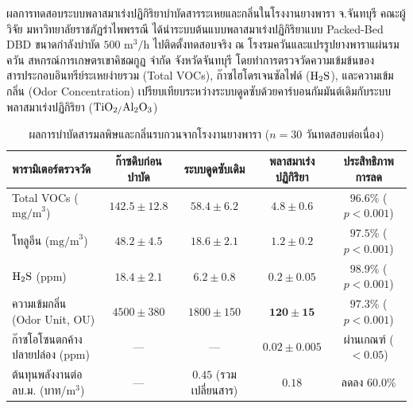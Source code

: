 \begin{agribox}{ผลการทดสอบระบบพลาสมาเร่งปฏิกิริยาบำบัดสารระเหยและกลิ่นในโรงงานยางพารา จ.จันทบุรี}
คณะผู้วิจัย มหาวิทยาลัยราชภัฏรำไพพรรณี ได้นำระบบต้นแบบพลาสมาเร่งปฏิกิริยาแบบ Packed-Bed DBD ขนาดกำลังบำบัด $500 \text{ m}^3/\text{h}$ ไปติดตั้งทดสอบจริง ณ โรงรมควันและแปรรูปยางพาราแผ่นรมควัน สหกรณ์การเกษตรเขาคิชฌกูฏ จำกัด จังหวัดจันทบุรี โดยทำการตรวจวัดความเข้มข้นของสารประกอบอินทรีย์ระเหยง่ายรวม (Total VOCs), ก๊าซไฮโดรเจนซัลไฟด์ ($\ce{H2S}$), และความเข้มกลิ่น (Odor Concentration) เปรียบเทียบระหว่างระบบดูดซับด้วยคาร์บอนกัมมันต์เดิมกับระบบพลาสมาเร่งปฏิกิริยา ($\ce{TiO2/Al2O3}$)

\begin{table}[H]
\centering
\small
\caption{ผลการบำบัดสารมลพิษและกลิ่นรบกวนจากโรงงานยางพารา ($n = 30$ วันทดสอบต่อเนื่อง)}
\label{tab:ch07_rubber_results}
\begin{tabular}{lcccc}
\toprule
\textbf{พารามิเตอร์ตรวจวัด} & \textbf{ก๊าซดิบก่อนบำบัด} & \textbf{ระบบดูดซับเดิม} & \textbf{พลาสมาเร่งปฏิกิริยา} & \textbf{ประสิทธิภาพการลด} \\
\midrule
Total VOCs ($\text{mg/m}^3$) & $142.5 \pm 12.8$ & $58.4 \pm 6.2$ & $\mathbf{4.8 \pm 0.6}$ & $\mathbf{96.6\%}$ ($p < 0.001$) \\
โทลูอีน ($\text{mg/m}^3$) & $48.2 \pm 4.5$ & $18.6 \pm 2.1$ & $\mathbf{1.2 \pm 0.2}$ & $\mathbf{97.5\%}$ ($p < 0.001$) \\
$\ce{H2S}$ ($\text{ppm}$) & $18.4 \pm 2.1$ & $6.2 \pm 0.8$ & $\mathbf{0.2 \pm 0.05}$ & $\mathbf{98.9\%}$ ($p < 0.001$) \\
ความเข้มกลิ่น (Odor Unit, OU) & $4500 \pm 380$ & $1800 \pm 150$ & $\mathbf{120 \pm 15}$ & $\mathbf{97.3\%}$ ($p < 0.001$) \\
ก๊าซโอโซนตกค้างปลายปล่อง ($\text{ppm}$) & --- & --- & $\mathbf{0.02 \pm 0.005}$ & ผ่านเกณฑ์ ($<0.05$) \\
ต้นทุนพลังงานต่อ ลบ.ม. (บาท/$\text{m}^3$) & --- & $0.45$ (รวมเปลี่ยนสาร) & $\mathbf{0.18}$ & ลดลง $60.0\%$ \\
\bottomrule
\end{tabular}
\end{table}


\end{agribox}
